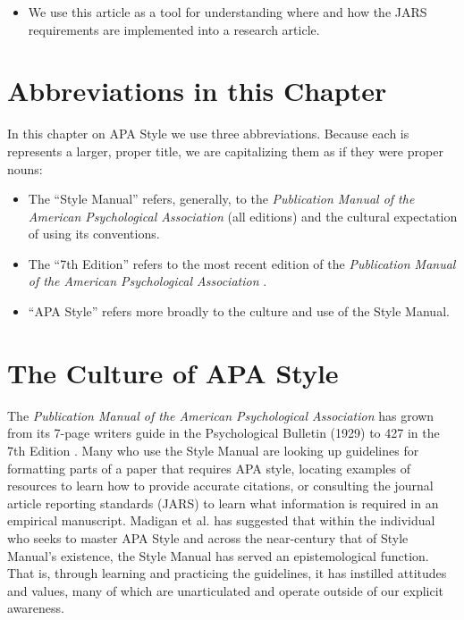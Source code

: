 \documentclass[
  11pt,
]{book}
\providecommand{\tightlist}{%
  \setlength{\itemsep}{0pt}\setlength{\parskip}{0pt}}
\begin{document}
\begin{itemize}
  \begin{itemize}
  \tightlist
  \item
    We use this article as a tool for understanding where and how the JARS requirements are implemented into a research article.
  \end{itemize}
\end{itemize}

\section{Abbreviations in this Chapter}\label{abbreviations-in-this-chapter}

In this chapter on APA Style we use three abbreviations. Because each is represents a larger, proper title, we are capitalizing them as if they were proper nouns:

\begin{itemize}
\tightlist
\item
  The ``Style Manual'' refers, generally, to the \emph{Publication Manual of the American Psychological Association} (all editions) and the cultural expectation of using its conventions.
\item
  The ``7th Edition'' refers to the most recent edition of the \emph{Publication Manual of the American Psychological Association} \citep{american_psychological_association_publication_2020}.
\item
  ``APA Style'' refers more broadly to the culture and use of the Style Manual.
\end{itemize}

\section{The Culture of APA Style}\label{the-culture-of-apa-style}

The \emph{Publication Manual of the American Psychological Association} has grown from its 7-page writers guide in the Psychological Bulletin (1929) to 427 in the 7th Edition \citep{american_psychological_association_publication_2020}. Many who use the Style Manual are looking up guidelines for formatting parts of a paper that requires APA style, locating examples of resources to learn how to provide accurate citations, or consulting the journal article reporting standards (JARS) to learn what information is required in an empirical manuscript. Madigan et al. \citeyearpar{madigan_language_1995} has suggested that within the individual who seeks to master APA Style and across the near-century that of Style Manual's existence, the Style Manual has served an epistemological function. That is, through learning and practicing the guidelines, it has instilled attitudes and values, many of which are unarticulated and operate outside of our explicit awareness.
\end{document}
